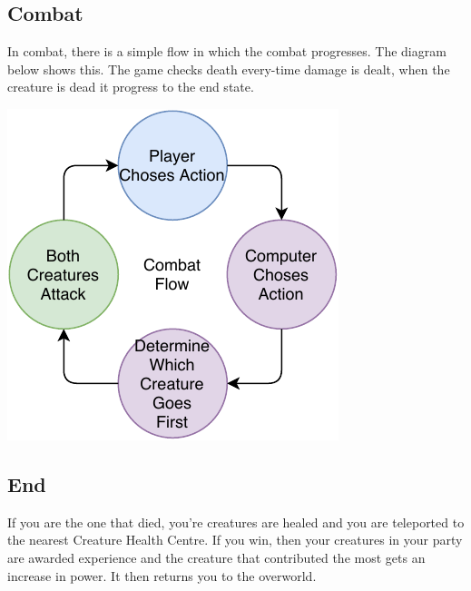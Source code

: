 \documentclass[11pt,a4paper]{article}
\begin{document}
\subsection{Combat}
In combat, there is a simple flow in which the combat progresses. The diagram below shows this. The game checks death every-time damage is dealt, when the creature is dead it progress to the end state.
\begin{center}
\includegraphics[scale=1.2]{pdfs/combatflow.pdf}
\end{center}

\subsection{End}
If you are the one that died, you're creatures are healed and you are teleported to the nearest Creature Health Centre. If you win, then your creatures in your party are awarded experience and the creature that contributed the most gets an increase in power. It then returns you to the overworld.


\end{document}
